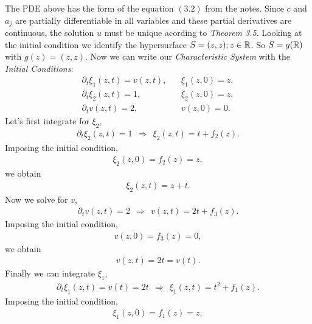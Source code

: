 \begin{questions}


\begin{solution}
The PDE above has the form of the equation $(3.2)$ from the notes. Since $c$ and $a_j$ are partially differentiable in all variables and these partial derivatives are continuous, the solution $u$ must be unique acording to \textsl{Theorem 3.5}. Looking at the initial condition we identify the hypersurface $S={(z,z);z\in\mathbb{R}}$. So $S=g(\mathbb{R})$ with $g(z)=(z,z)$. Now we can write our \textit{Characteristic System} with the \textit{Initial Conditions}:
\begin{align*}
\partial_t\xi_1(z,t)=v(z,t),~~&~~\xi_1(z,0)=z,\\
\partial_t\xi_2(z,t)=1,~~&~~\xi_2(z,0)=z,\\
\partial_tv(z,t)=2,~~&~~v(z,0)=0.
\end{align*}
Let's first integrate for $\xi_2$,
\begin{align*}
\partial_t\xi_2(z,t)=1~~\Rightarrow~~ \xi_2(z,t)=t+f_2(z).
\end{align*}
Imposing the initial condition,
\begin{align*}
\xi_2(z,0)=f_2(z)=z,
\end{align*}
we obtain
\begin{align*}
\xi_2(z,t)=z+t.
\end{align*}
Now we solve for $v$,
\begin{align*}
\partial_tv(z,t)=2~~\Rightarrow~~ v(z,t)=2t+f_3(z).
\end{align*}
Imposing the initial condition,
\begin{align*}
v(z,0)=f_3(z)=0,
\end{align*}
we obtain
\begin{align*}
v(z,t)=2t=v(t).
\end{align*}
Finally we can integrate $\xi_1$,
\begin{align*}
\partial_t\xi_1(z,t)=v(t)=2t~~\Rightarrow~~ \xi_1(z,t)=t^2+f_1(z).
\end{align*}
Imposing the initial condition,
\begin{align*}
\xi_1(z,0)=f_1(z)=z,
\end{align*}

\end{solution}
\end{questions}
